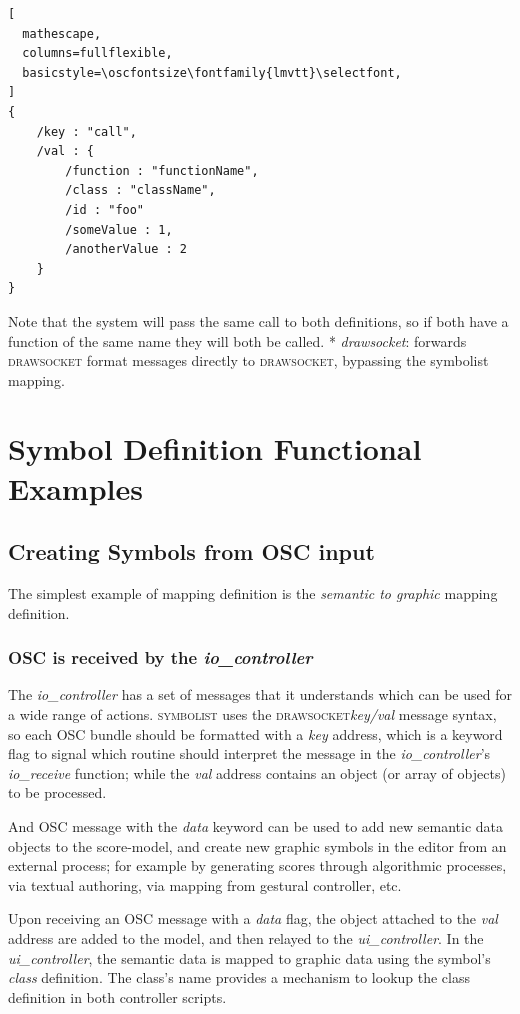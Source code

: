 \documentclass{article}
\def\symbolist{\textsc{symbolist}\xspace}
\def\drawsocket{\textsc{drawsocket}\xspace}
\def\uicontroller{\textit{ui\_controller}\xspace}
\def\iocontroller{\textit{io\_controller}\xspace}
\def\oscfontsize{\footnotesize}
\begin{document}
\begin{lstlisting}[
  mathescape,
  columns=fullflexible,
  basicstyle=\oscfontsize\fontfamily{lmvtt}\selectfont,
]
{
    /key : "call",
    /val : {
        /function : "functionName",
        /class : "className",
        /id : "foo"
        /someValue : 1,
        /anotherValue : 2
    }
}
\end{lstlisting}

Note that the system will pass the same call to both definitions, so if both have a function of the same name they will both be called.
* \textit{drawsocket}: forwards \drawsocket format messages directly to \drawsocket, bypassing the symbolist mapping.






\section{Symbol Definition Functional Examples}

\subsection{Creating Symbols from OSC input}

The simplest example of mapping definition is the \textit{semantic to graphic} mapping definition.

\subsubsection{OSC is received by the \iocontroller}

The \iocontroller has a set of messages that it understands which can be used for a wide range of actions.
\symbolist uses the \drawsocket \textit{key/val} message syntax, so each OSC bundle should be formatted with a \textit{key} address, which is a keyword flag to signal which routine should interpret the message in the \iocontroller's \textit{io\_receive} function; while the \textit{val} address contains an object (or array of objects) to be processed.

And OSC message with the \textit{data} keyword can be used to add new semantic data objects to the score-model, and create new graphic symbols in the editor from an external process;  for example by generating scores through algorithmic processes, via textual authoring, via mapping from gestural controller, etc.

Upon receiving an OSC message with a \textit{data} flag, the object attached to the \textit{val} address are added to the model, and then relayed to the \uicontroller.
In the \uicontroller, the semantic data is mapped to graphic data using the symbol's \textit{class} definition. The class's name provides a mechanism to lookup the class definition in both controller scripts.
\end{document}
